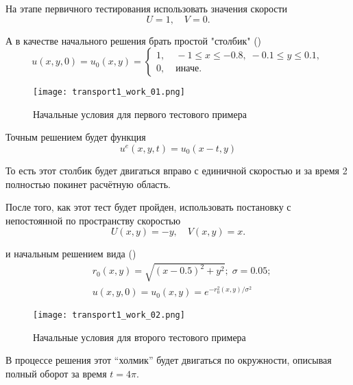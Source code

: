 На этапе первичного тестирования использовать
значения скорости
\begin{equation*}
    U = 1, \quad V = 0.
\end{equation*}

А в качестве начального решения брать простой "столбик" ()
\begin{equation*}
    u(x,y,0) = u_0(x, y) = \begin{cases}
        1, & \; -1\leq x \leq -0.8, \; -0.1 \leq y \leq 0.1, \\
        0, & \; \text{иначе}.
    \end{cases}
\end{equation*}

\begin{figure}[h]
\centering
\texttt{[image: transport1\_work\_01.png]}
\caption{Начальные условия для первого тестового примера}
\label{fig:transport1_work_01}
\end{figure}

Точным решением будет функция
\begin{equation*}
    u^e(x, y, t) = u_0(x-t, y)
\end{equation*}

То есть этот столбик будет двигаться вправо с единичной
скоростью и за время 2 полностью покинет расчётную область.

\label{sec:circle_transport}

После того, как этот тест будет пройден,
использовать постановку с непостоянной по пространству скоростью
\begin{equation*}
    U(x, y) = -y, \quad V(x, y) = x.
\end{equation*}

и начальным решением вида ()
\begin{align*}
    &r_0(x, y) = \sqrt{(x - 0.5)^2 + y^2}; \; \sigma = 0.05;\\
    &u(x, y, 0) = u_0(x, y) = e^{-r_0^2(x, y)/\sigma^2}
\end{align*}

\begin{figure}[h]
\centering
\texttt{[image: transport1\_work\_02.png]}
\caption{Начальные условия для второго тестового примера}
\label{fig:transport1_work_02}
\end{figure}

В процессе решения этот ``холмик'' будет
двигаться по окружности, описывая полный оборот за время $t=4\pi$.

